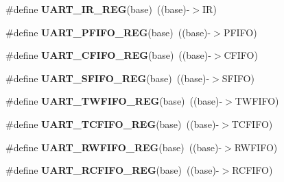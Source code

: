 \begin{DoxyCompactItemize}
\item 
\#define {\bfseries U\+A\+R\+T\+\_\+\+I\+R\+\_\+\+R\+EG}(base)~((base)-\/$>$IR)\hypertarget{group__UART__Register__Accessor__Macros_ga62976343fb3a729419dedc862e71341f}{}\label{group__UART__Register__Accessor__Macros_ga62976343fb3a729419dedc862e71341f}

\item 
\#define {\bfseries U\+A\+R\+T\+\_\+\+P\+F\+I\+F\+O\+\_\+\+R\+EG}(base)~((base)-\/$>$P\+F\+I\+FO)\hypertarget{group__UART__Register__Accessor__Macros_ga0a3d43cb2d3a60682bae6bd0380b5c48}{}\label{group__UART__Register__Accessor__Macros_ga0a3d43cb2d3a60682bae6bd0380b5c48}

\item 
\#define {\bfseries U\+A\+R\+T\+\_\+\+C\+F\+I\+F\+O\+\_\+\+R\+EG}(base)~((base)-\/$>$C\+F\+I\+FO)\hypertarget{group__UART__Register__Accessor__Macros_ga6b3e1791bd0636f6b0476b2031b35e9b}{}\label{group__UART__Register__Accessor__Macros_ga6b3e1791bd0636f6b0476b2031b35e9b}

\item 
\#define {\bfseries U\+A\+R\+T\+\_\+\+S\+F\+I\+F\+O\+\_\+\+R\+EG}(base)~((base)-\/$>$S\+F\+I\+FO)\hypertarget{group__UART__Register__Accessor__Macros_ga9944b8403a727f616325aa3cd807c00e}{}\label{group__UART__Register__Accessor__Macros_ga9944b8403a727f616325aa3cd807c00e}

\item 
\#define {\bfseries U\+A\+R\+T\+\_\+\+T\+W\+F\+I\+F\+O\+\_\+\+R\+EG}(base)~((base)-\/$>$T\+W\+F\+I\+FO)\hypertarget{group__UART__Register__Accessor__Macros_ga0c8f0b867baf783c1e07ce608fa1dac6}{}\label{group__UART__Register__Accessor__Macros_ga0c8f0b867baf783c1e07ce608fa1dac6}

\item 
\#define {\bfseries U\+A\+R\+T\+\_\+\+T\+C\+F\+I\+F\+O\+\_\+\+R\+EG}(base)~((base)-\/$>$T\+C\+F\+I\+FO)\hypertarget{group__UART__Register__Accessor__Macros_ga5d597a97bb96581bc97287b6f98e2480}{}\label{group__UART__Register__Accessor__Macros_ga5d597a97bb96581bc97287b6f98e2480}

\item 
\#define {\bfseries U\+A\+R\+T\+\_\+\+R\+W\+F\+I\+F\+O\+\_\+\+R\+EG}(base)~((base)-\/$>$R\+W\+F\+I\+FO)\hypertarget{group__UART__Register__Accessor__Macros_gae268db11fe8d713c544e24683cb910c3}{}\label{group__UART__Register__Accessor__Macros_gae268db11fe8d713c544e24683cb910c3}

\item 
\#define {\bfseries U\+A\+R\+T\+\_\+\+R\+C\+F\+I\+F\+O\+\_\+\+R\+EG}(base)~((base)-\/$>$R\+C\+F\+I\+FO)\hypertarget{group__UART__Register__Accessor__Macros_gadc8c7a97ccfeb54323ebd5f3912a27ff}{}\label{group__UART__Register__Accessor__Macros_gadc8c7a97ccfeb54323ebd5f3912a27ff}


\end{DoxyCompactItemize}
